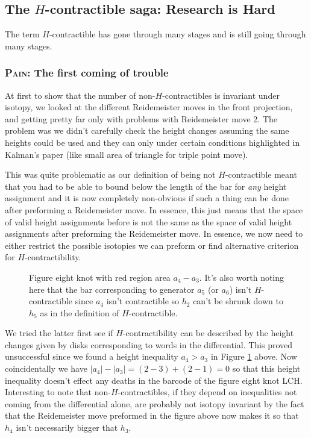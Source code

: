 \documentclass[11pt,oneside]{amsart}
\begin{document}
\subsection{The $H$-contractible saga: Research is Hard} The term $H$-contractible has gone through many stages and is still going through many stages.

\subsubsection{\textsc{Pain}: The first coming of trouble} At first to show that the number of non-$H$-contractibles is invariant under isotopy, we looked at the different Reidemeister moves in the front projection, and getting pretty far only with problems with Reidemeister move 2. The problem was we didn't carefully check the height changes assuming the same heights could be used and they can only under certain conditions highlighted in Kalman's paper (like small area of triangle for triple point move).

This was quite problematic as our definition of being not $H$-contractible meant that you had to be able to bound below the length of the bar for \textit{any} height assignment and it is now completely non-obvious if such a thing can be done after preforming a Reidemeister move. In essence, this just means that the space of valid height assignments before is not the same as the space of valid height assignments after preforming the Reidemeister move. In essence, we now need to either restrict the possible isotopies we can preform or find alternative criterion for $H$-contractibility.

\begin{figure}[htbp]
  \label{fig:Figure8}
  \centering
  
  \caption{Figure eight knot with red region area $a_4-a_3$. It's also worth noting here that the bar corresponding to generator $a_5$ (or $a_6$) isn't $H$-contractible since $a_4$ isn't contractible so $h_2$ can't be shrunk down to $h_5$ as in the definition of $H$-contractible.}
\end{figure}

We tried the latter first see if $H$-contractibility can be described by the height changes given by disks corresponding to words in the differential. This proved unsuccessful since we found a height inequality $a_4>a_3$ in Figure \ref{fig:Figure8} above. Now coincidentally we have $|a_4|-|a_3|=(2-3)+(2-1)=0$ so that this height inequality doesn't effect any deaths in the barcode of the figure eight knot LCH. Interesting to note that non-$H$-contractibles, if they depend on inequalities not coming from the differential alone, are probably not isotopy invariant by the fact that the Reidemeister move preformed in the figure above now makes it so that $h_4$ isn't necessarily bigger that $h_3$.
\end{document}
